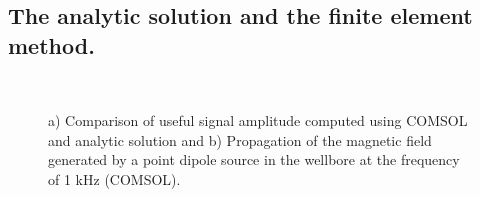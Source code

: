 \documentclass[10pt,twoside]{article}
\begin{document}
\subsection{The analytic solution and the finite element method.}

\begin{figure}[ht!]
\begin{minipage}{0.5\linewidth}
\end{minipage}
\hfill
\begin{minipage}{0.4\linewidth}
\end{minipage}
\caption{a) Comparison of useful signal amplitude computed using COMSOL and analytic solution and b) Propagation of the magnetic field generated by a point dipole source in the wellbore at the frequency of 1 kHz (COMSOL). }
\label{comsol_compare}\

\end{figure}
\end{document}
